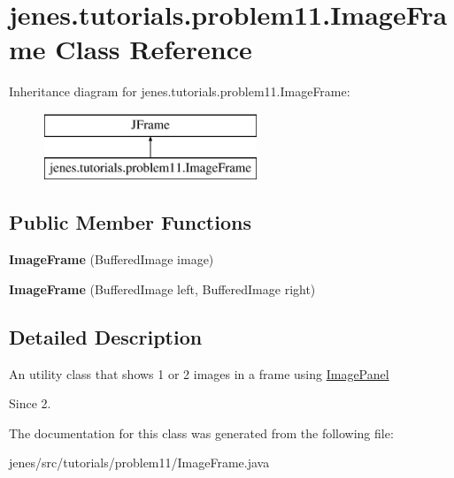 \hypertarget{classjenes_1_1tutorials_1_1problem11_1_1_image_frame}{\section{jenes.\-tutorials.\-problem11.\-Image\-Frame Class Reference}
\label{classjenes_1_1tutorials_1_1problem11_1_1_image_frame}
}
Inheritance diagram for jenes.\-tutorials.\-problem11.\-Image\-Frame\-:\begin{figure}[H]
\begin{center}
\leavevmode
\includegraphics[height=2.000000cm]{classjenes_1_1tutorials_1_1problem11_1_1_image_frame}
\end{center}
\end{figure}
\subsection*{Public Member Functions}
\begin{DoxyCompactItemize}
\item 
\hypertarget{classjenes_1_1tutorials_1_1problem11_1_1_image_frame_ae07ab83a8781fd5748c34fd4c0ef4cfb}{{\bfseries Image\-Frame} (Buffered\-Image image)}\label{classjenes_1_1tutorials_1_1problem11_1_1_image_frame_ae07ab83a8781fd5748c34fd4c0ef4cfb}

\item 
\hypertarget{classjenes_1_1tutorials_1_1problem11_1_1_image_frame_a7cdded840043588eef66524cdab0af13}{{\bfseries Image\-Frame} (Buffered\-Image left, Buffered\-Image right)}\label{classjenes_1_1tutorials_1_1problem11_1_1_image_frame_a7cdded840043588eef66524cdab0af13}

\end{DoxyCompactItemize}


\subsection{Detailed Description}
An utility class that shows 1 or 2 images in a frame using \hyperlink{classjenes_1_1tutorials_1_1problem11_1_1_image_panel}{Image\-Panel}

\begin{DoxySince}{Since}
2. 
\end{DoxySince}


The documentation for this class was generated from the following file\-:\begin{DoxyCompactItemize}
\item 
jenes/src/tutorials/problem11/Image\-Frame.\-java\end{DoxyCompactItemize}
